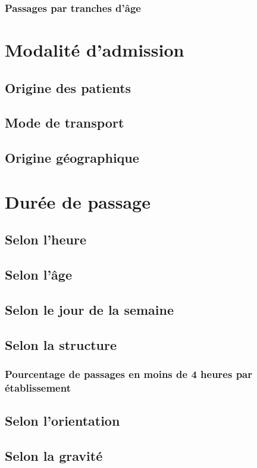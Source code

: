 \documentclass[12pt,english,french]{report}\usepackage{graphicx, color}
\begin{document}
\subsection*{Passages par tranches d'âge}

\chapter{Modalité d'admission}
\section*{Origine des patients}
\section*{Mode de transport}
\section*{Origine géographique}

\chapter{Durée de passage}
\section*{Selon l'heure}
\section*{Selon l'âge}
\section*{Selon le jour de la semaine}
\section*{Selon la structure}
\subsection*{Pourcentage de passages en moins de 4 heures par établissement}
\section*{Selon l'orientation}
\section*{Selon la gravité}
\end{document}

